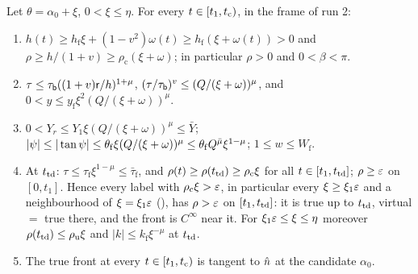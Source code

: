 \begin{lemma}\label{lem:fwd}
Let $\theta=\alpha_0+\xi$, $0<\xi\le\eta$. For every $t\in[t_1,t_{\mathrm c})$, in the frame of run 2:
\begin{enumerate}
\item[(a)] $h(t)\ge h_{\mathrm f}\xi+(1-v^2)\omega(t)\ge h_{\mathrm f}(\xi+\omega(t))>0$ and $\rho\ge h/(1+v)\ge\rho_{\mathrm c}(\xi+\omega)$;
in particular $\rho>0$ and $0<\beta<\pi$.
\item[(b)] $\tau\le\tau_{\mathsf b}((1+v)\mathsf r/h)^{1+\mu}$, $(\tau/\tau_{\mathsf b})^v\le(Q/(\xi+\omega))^\mu$, and
$0<y\le y_{\mathrm f}\xi^2(Q/(\xi+\omega))^\mu$.
\item[(c)] $0<Y_r\le Y_1\xi(Q/(\xi+\omega))^\mu\le\bar Y$; $|\psi|\le|\tan\psi|\le\theta_{\mathrm f}\xi(Q/(\xi+\omega))^\mu\le
\theta_{\mathrm f}Q^{\bar\mu}\xi^{1-\mu}$; $1\le w\le W_{\mathrm f}$.
\item[(d)] At $t_{\mathrm{td}}$: $\tau\le\tau_{\mathrm f}\xi^{1-\mu}\le\bar\tau_{\mathrm f}$, and $\rho(t)\ge\rho(t_{\mathrm{td}})\ge\rho_{\mathrm c}\xi$ for all
$t\in[t_1,t_{\mathrm{td}}]$; $\rho\ge\varepsilon$ on $[0,t_1]$. Hence every label with $\rho_{\mathrm c}\xi>\varepsilon$, in particular every
$\xi\ge\xi_1\varepsilon$ and a neighbourhood of $\xi=\xi_1\varepsilon$ (), has $\rho>\varepsilon$ on $[t_1,t_{\mathrm{td}}]$: it is true up to $t_{\mathrm{td}}$,
virtual $=$ true there, and the front is $C^\infty$ near it. For $\xi_1\varepsilon\le\xi\le\eta$ moreover $\rho(t_{\mathrm{td}})\le\rho_{\mathrm u}\xi$
and $|k|\le k_{\mathrm f}\xi^{-\mu}$ at $t_{\mathrm{td}}$.
\item[(e)] The true front at every $t\in[t_1,t_{\mathrm c})$ is tangent to $\hat n$ at the candidate $\alpha_0$.
\end{enumerate}
\end{lemma}
